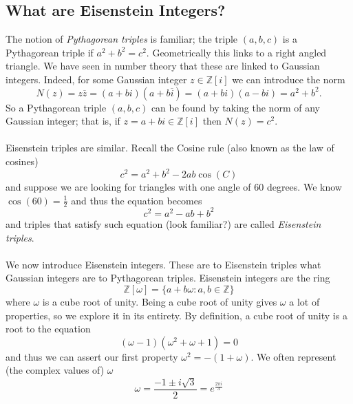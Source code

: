 \documentclass[12pt]{article}
\newcommand*\conj[1]{\overline{#1}}
\newcommand{\Z}{\mathbb{Z}}
\begin{document}
\subsection{What are Eisenstein Integers?}
The notion of \textit{Pythagorean triples} is familiar; the triple $(a, b, c)$ is a Pythagorean triple if $a^2 + b^2 = c^2$. Geometrically this links to a right angled triangle. We have seen in number theory that these are linked to Gaussian integers. Indeed, for some Gaussian integer $z \in \Z[i]$ we can introduce the norm
\begin{equation*}
    N(z) = z\conj{z} = (a + bi)(a + b\conj{i}) = (a+bi)(a-bi) =  a^2 + b^2.
\end{equation*}
So a Pythagorean triple $(a, b, c)$ can be found by taking the norm of any Gaussian integer; that is, if $z = a + bi \in \Z[i]$ then $N(z) = c^2$.\\\\
Eisenstein triples are similar. Recall the Cosine rule (also known as the law of cosines)
\begin{equation*}
    c^2 = a^2 + b^2 - 2ab\cos(C)
\end{equation*}
and suppose we are looking for triangles with one angle of $60$ degrees. We know $\cos(60) = \frac{1}{2}$ and thus the equation becomes
\begin{equation*}
    c^2 = a^2 - ab + b^2
\end{equation*}
and triples that satisfy such equation (look familiar?) are called \textit{Eisenstein triples}.\\\\
We now introduce Eisenstein integers. These are to Eisenstein triples what Gaussian integers are to Pythagorean triples. Eisenstein integers are the ring
\begin{equation*}
    \Z[\omega] = \{a + b\omega : a, b \in \Z\}
\end{equation*}
where $\omega$ is a cube root of unity. Being a cube root of unity gives $\omega$ a lot of properties, so we explore it in its entirety. By definition, a cube root of unity is a root to the equation
\begin{equation*}
    (\omega-1)(\omega^2 + \omega + 1) = 0
\end{equation*}
and thus we can assert our first property $\omega^2 = -(1 + \omega)$. We often represent (the complex values of) $\omega$ 
\begin{equation*}
    \omega = \frac{-1 \pm i\sqrt{3}}{2} = e^{\frac{2\pi i }{3}}
\end{equation*}
\end{document}
